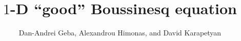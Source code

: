 \documentclass[12pt,reqno]{amsart}
\numberwithin{equation}{section}  %
\numberwithin{figure}{section}
\theoremstyle{plain}
\theoremstyle{definition}
\theoremstyle{remark}
\begin{document}
\title{$1$-D ``good'' Boussinesq equation}

\author{Dan-Andrei Geba, Alexandrou Himonas, and David Karapetyan}

\address{Department of Mathematics, University of Rochester, Rochester, NY 14627}
\address{Department of Mathematics, University of Notre Dame, Notre Dame, IN 46556}
\address{Department of Mathematics, University of Notre Dame, Notre Dame, IN 46556}
\date{}



\maketitle
%
%
\end{document}
